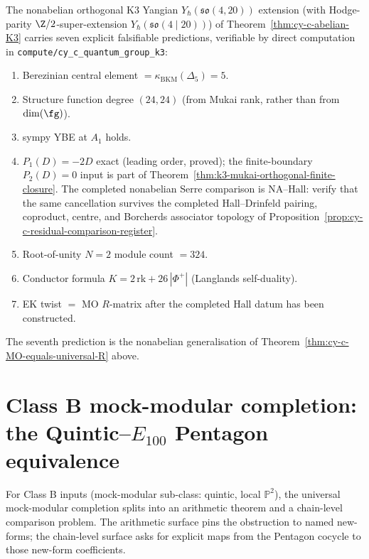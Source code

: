 The nonabelian orthogonal K$3$ Yangian $Y_\hbar(\mathfrak{so}(4, 20))$ extension (with Hodge-parity $\Z/2$-super-extension $Y_\hbar(\mathfrak{so}(4 \mid 20))$) of
Theorem~\ref{thm:cy-c-abelian-K3} carries seven explicit falsifiable
predictions, verifiable by direct computation in
\texttt{compute/cy\_c\_quantum\_group\_k3}:
\begin{enumerate}
\item Berezinian central element $= \kappa_{\mathrm{BKM}}(\Delta_5) = 5$.
\item Structure function degree $(24, 24)$
 \textup{(}from Mukai rank, rather than from $\dim(\fg)$\textup{).}
\item sympy YBE at $A_1$ holds.
\item $P_1(D) = -2D$ exact \textup{(}leading order, proved\textup{);}
 the finite-boundary $P_2(D)=0$ input is part of
 Theorem~\ref{thm:k3-mukai-orthogonal-finite-closure}. The
 completed nonabelian Serre comparison is \textup{NA--Hall}:
 verify that the same cancellation survives the completed
 Hall--Drinfeld pairing, coproduct, centre, and Borcherds
 associator topology of
 Proposition~\ref{prop:cy-c-residual-comparison-register}.
\item Root-of-unity $N = 2$ module count $= 324$.
\item Conductor formula $K = 2\,\mathrm{rk} + 26\,|\Phi^+|$
 \textup{(}Langlands self-duality\textup{).}
\item EK twist $=$ MO $R$-matrix after the completed Hall datum has
 been constructed.
\end{enumerate}
The seventh prediction is the nonabelian generalisation of
Theorem~\ref{thm:cy-c-MO-equals-universal-R} above.


\section{Class B mock-modular completion: the Quintic--\texorpdfstring{$E_{100}$}{E-100} Pentagon
 equivalence}
\label{sec:cy-c-class-B-quintic}

For Class B inputs (mock-modular sub-class: quintic, local $\mathbb{P}^2$),
the universal mock-modular completion splits into an
arithmetic theorem and a chain-level comparison problem. The
arithmetic surface pins the obstruction to named new-forms; the
chain-level surface asks for explicit maps from the Pentagon cocycle to
those new-form coefficients.


